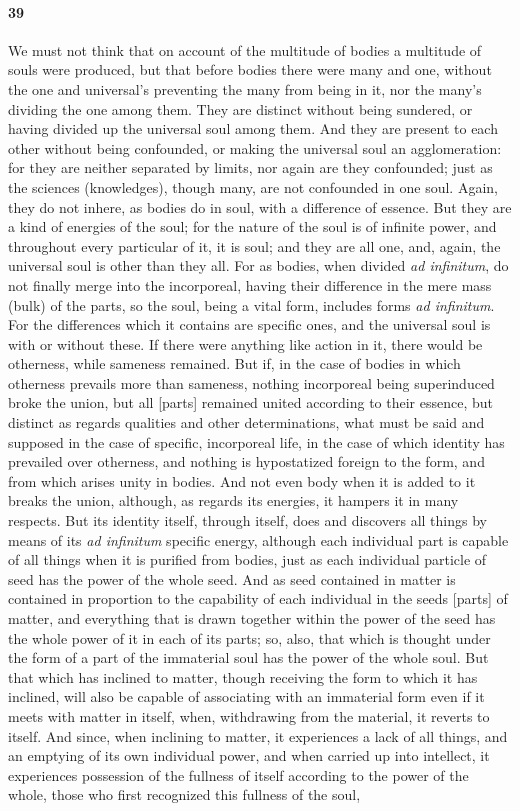 \documentclass{article}
\begin{document}
\paragraph{39} We must not think that on account of the multitude of bodies a multitude of souls were produced, but that before bodies there were many and one, without the one and universal's preventing the many from being in it, nor the many's dividing the one among them. They are distinct without being sundered, or having divided up the universal soul among them. And they are present to each other without being confounded, or making the universal soul an agglomeration: for they are neither separated by limits, nor again are they confounded; just as the sciences (knowledges), though many, are not confounded in one soul. Again, they do not inhere, as bodies do in soul, with a difference of essence. But they are a kind of energies of the soul; for the nature of the soul is of infinite power, and throughout every particular of it, it is soul; and they are all one, and, again, the universal soul is other than they all. For as bodies, when divided \textit{ad infinitum}, do not finally merge into the incorporeal, having their difference in the mere mass (bulk) of the parts, so the soul, being a vital form, includes forms \textit{ad infinitum}. For the differences which it contains are specific ones, and the universal soul is with or without these. If there were anything like action in it, there would be otherness, while sameness remained. But if, in the case of bodies in which otherness prevails more than sameness, nothing incorporeal being superinduced broke the union, but all [parts] remained united according to their essence, but distinct as regards qualities and other determinations, what must be said and supposed in the case of specific, incorporeal life, in the case of which identity has prevailed over otherness, and nothing is hypostatized foreign to the form, and from which arises unity in bodies. And not even body when it is added to it breaks the union, although, as regards its energies, it hampers it in many respects. But its identity itself, through itself, does and discovers all things by means of its \textit{ad infinitum} specific energy, although each individual part is capable of all things when it is purified from bodies, just as each individual particle of seed has the power of the whole seed. And as seed contained in matter is contained in proportion to the capability of each individual in the seeds [parts] of matter, and everything that is drawn together within the power of the seed has the whole power of it in each of its parts; so, also, that which is thought under the form of a part of the immaterial soul has the power of the whole soul. But that which has inclined to matter, though receiving the form to which it has inclined, will also be capable of associating with an immaterial form even if it meets with matter in itself, when, withdrawing from the material, it reverts to itself. And since, when inclining to matter, it experiences a lack of all things, and an emptying of its own individual power, and when carried up into intellect, it experiences possession of the fullness of itself according to the power of the whole, those who first recognized this fullness of the soul, 
\end{document}
